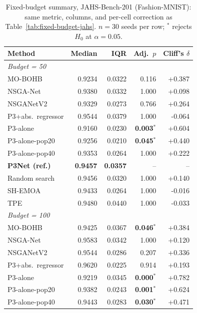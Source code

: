 \begin{table}[t]
    \centering
    \footnotesize
    \caption{Fixed-budget summary, JAHS-Bench-201 (Fashion-MNIST): same metric, columns, and per-cell
    correction as Table~\ref{tab:fixed-budget-jahs}. $n=30$ seeds per row; $^{*}$ rejects $H_0$ at
    $\alpha=0.05$.}
    \label{tab:fixed-budget-fashion}
    \begin{tabular}{@{}lrrrr@{}}
        \toprule
        \textbf{Method} & \textbf{Median} & \textbf{IQR} & \textbf{Adj.\ $p$} & \textbf{Cliff's $\delta$} \\
        \midrule
        \multicolumn{5}{l}{\emph{Budget = 50}} \\
        MO-BOHB & 0.9234 & 0.0322 & 0.116 & +0.387 \\
        NSGA-Net & 0.9380 & 0.0332 & 1.000 & +0.098 \\
        NSGANetV2 & 0.9329 & 0.0273 & 0.766 & +0.264 \\
        P3+abs.\ regressor & 0.9544 & 0.0379 & 1.000 & -0.064 \\
        P3-alone & 0.9160 & 0.0230 & \textbf{0.003$^{*}$} & +0.604 \\
        P3-alone-pop20 & 0.9256 & 0.0210 & \textbf{0.045$^{*}$} & +0.440 \\
        P3-alone-pop40 & 0.9353 & 0.0264 & 1.000 & +0.222 \\
        \textbf{P3Net (ref.)} & \textbf{0.9457} & \textbf{0.0357} & -- & -- \\
        Random search & 0.9456 & 0.0320 & 1.000 & +0.140 \\
        SH-EMOA & 0.9433 & 0.0264 & 1.000 & -0.016 \\
        TPE & 0.9480 & 0.0440 & 1.000 & -0.033 \\
        \midrule
        \multicolumn{5}{l}{\emph{Budget = 100}} \\
        MO-BOHB & 0.9425 & 0.0367 & \textbf{0.046$^{*}$} & +0.384 \\
        NSGA-Net & 0.9583 & 0.0342 & 1.000 & +0.120 \\
        NSGANetV2 & 0.9544 & 0.0286 & 0.207 & +0.336 \\
        P3+abs.\ regressor & 0.9620 & 0.0225 & 0.914 & +0.193 \\
        P3-alone & 0.9219 & 0.0345 & \textbf{0.000$^{*}$} & +0.782 \\
        P3-alone-pop20 & 0.9382 & 0.0243 & \textbf{0.001$^{*}$} & +0.624 \\
        P3-alone-pop40 & 0.9443 & 0.0283 & \textbf{0.030$^{*}$} & +0.471 \\

\end{tabular}
\end{table}
